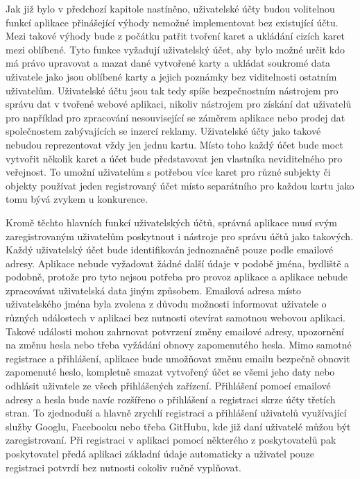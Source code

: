 \begin{itemize}
\begin{itemize}
	Jak již bylo v předchozí kapitole nastíněno, uživatelské účty budou volitelnou funkcí aplikace přinášející výhody
	nemožné implementovat bez existující účtu.
	Mezi takové výhody bude z počátku patřit tvoření karet a ukládání cizích karet mezi oblíbené.
	Tyto funkce vyžadují uživatelský účet, aby bylo možné určit kdo má právo upravovat a mazat dané vytvořené karty
	a ukládat soukromé data uživatele jako jsou oblíbené karty a jejich poznámky bez viditelnosti ostatním uživatelům.
	Uživatelské účtu jsou tak tedy spíše bezpečnostním nástrojem pro správu dat v tvořené webové aplikaci, nikoliv
	nástrojem pro získání dat uživatelů pro například pro zpracování nesouvisející se záměrem aplikace nebo prodej dat
	společnostem zabývajících se inzercí reklamy.
	Uživatelské účty jako takové nebudou reprezentovat vždy jen jednu kartu.
	Místo toho každý účet bude moct vytvořit několik karet a účet bude představovat jen vlastníka neviditelného pro
	veřejnost.
	To umožní uživatelům s potřebou více karet pro různé subjekty či objekty používat jeden registrovaný účet místo
	separátního pro každou kartu jako tomu bývá zvykem u konkurence.

	Kromě těchto hlavních funkcí uživatelských účtů, správná aplikace musí svým zaregistrovaným uživatelům poskytnout
	i nástroje pro správu účtů jako takových.
	Každý uživatelský účet bude identifikován jednoznačně pouze podle emailové adresy.
	Aplikace nebude vyžadovat žádné další údaje v podobě jména, bydliště a podobně, protože pro tyto nejsou potřeba pro
	provoz aplikace a aplikace nebude zpracovávat uživatelská data jiným způsobem.
	Emailová adresa místo uživatelského jména byla zvolena z důvodu možnosti informovat uživatele o různých událostech
	v aplikaci bez nutnosti otevírat samotnou webovou aplikaci.
	Takové události mohou zahrnovat potvrzení změny emailové adresy, upozornění na změnu hesla nebo třeba vyžádání obnovy
	zapomenutého hesla.
	Mimo samotné registrace a přihlášení, aplikace bude umožňovat změnu emailu bezpečně obnovit zapomenuté heslo, kompletně
	smazat vytvořený účet se všemi jeho daty nebo odhlásit uživatele ze všech přihlášených zařízení.
	Přihlášení pomocí emailové adresy a hesla bude navíc rozšířeno o přihlášení a registraci skrze účty třetích stran.
	To zjednoduší a hlavně zrychlí registraci a přihlášení uživatelů využívající služby Googlu, Facebooku nebo třeba
	GitHubu, kde již daní uživatelé můžou být zaregistrovaní.
	Při registraci v aplikaci pomocí některého z poskytovatelů pak poskytovatel předá aplikaci základní údaje automaticky
	a uživatel pouze registraci potvrdí bez nutnosti cokoliv ručně vyplňovat.


\end{itemize}
\end{itemize}
